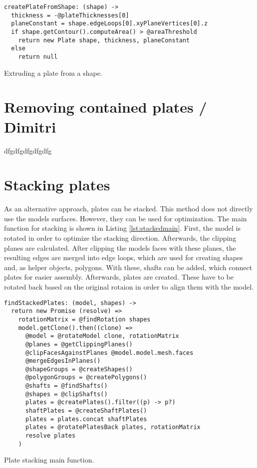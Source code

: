 \documentclass[../ClassicThesis.tex]{subfiles}
\begin{document}
\begin{listing}[ht]
\begin{verbatim}
createPlateFromShape: (shape) ->
  thickness = -@plateThicknesses[0]
  planeConstant = shape.edgeLoops[0].xyPlaneVertices[0].z
  if shape.getContour().computeArea() > @areaThreshold
    return new Plate shape, thickness, planeConstant
  else
    return null
\end{verbatim}
\caption{Extruding a plate from a shape.}
\label{lst:extrude}
\end{listing}

\section{Removing contained plates / Dimitri}

dfgdfgdfgdfgdfg

\section{Stacking plates}

As an alternative approach, plates can be stacked. This method does not directly use the models surfaces. However, they can be used for optimization.
The main function for stacking is shown in Listing \ref{lst:stackedmain}. First, the model is rotated in order to optimize the stacking direction. Afterwards, the clipping planes are calculated. After clipping the models faces with these planes, the resulting edges are merged into edge loops, which are used for creating shapes and, as helper objects, polygons. With these, shafts can be added, which connect plates for easier assembly. Afterwards, plates are created. These have to be rotated back based on the original rotaion in order to align them with the model. 

\begin{listing}[ht]
\begin{verbatim}
findStackedPlates: (model, shapes) ->
  return new Promise (resolve) =>
    rotationMatrix = @findRotation shapes
    model.getClone().then((clone) =>
      @model = @rotateModel clone, rotationMatrix
      @planes = @getClippingPlanes()
      @clipFacesAgainstPlanes @model.model.mesh.faces
      @mergeEdgesInPlanes()
      @shapeGroups = @createShapes()
      @polygonGroups = @createPolygons()
      @shafts = @findShafts()
      @shapes = @clipShafts()
      plates = @createPlates().filter((p) -> p?)
      shaftPlates = @createShaftPlates()
      plates = plates.concat shaftPlates
      plates = @rotatePlatesBack plates, rotationMatrix
      resolve plates
    )
\end{verbatim}
\caption{Plate stacking main function.}
\label{lst:stackedmain}
\end{listing}
\end{document}
